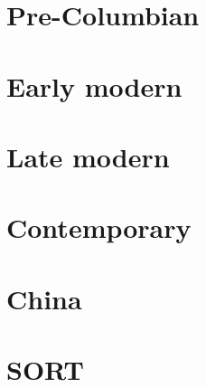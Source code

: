 \documentclass[oneside]{book}
\begin{document}
\part{Pre-Columbian}




\part{Early modern}



\part{Late modern}











\part{Contemporary}

\part{China}

\part{SORT}

\end{document}
